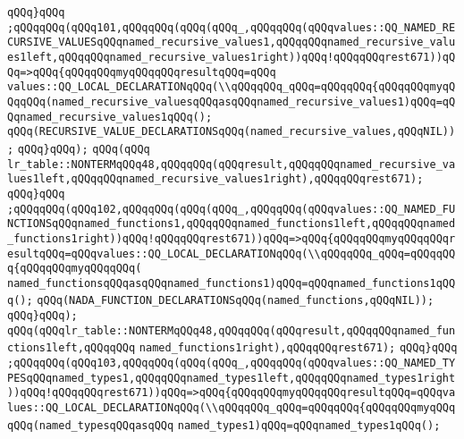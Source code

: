 \verb|qQQq}qQQq|\newline
\verb|;qQQqqQQq(qQQq101,qQQqqQQq(qQQq(qQQq_,qQQqqQQq(qQQqvalues::QQ_NAMED_RECURSIVE_VALUESqQQqnamed_recursive_values1,qQQqqQQqnamed_recursive_values1left,qQQqqQQqnamed_recursive_values1right))qQQq!qQQqqQQqrest671))qQQq=>qQQq{qQQqqQQqmyqQQqqQQqresultqQQq=qQQq|\newline
\verb|values::QQ_LOCAL_DECLARATIONqQQq(\\qQQqqQQq_qQQq=qQQqqQQq{qQQqqQQqmyqQQqqQQq(named_recursive_valuesqQQqasqQQqnamed_recursive_values1)qQQq=qQQqnamed_recursive_values1qQQq();|\newline
\verb|qQQq(RECURSIVE_VALUE_DECLARATIONSqQQq(named_recursive_values,qQQqNIL));|\newline
\verb|qQQq}qQQq);|\newline
\verb|qQQq(qQQq|\newline
\verb|lr_table::NONTERMqQQq48,qQQqqQQq(qQQqresult,qQQqqQQqnamed_recursive_values1left,qQQqqQQqnamed_recursive_values1right),qQQqqQQqrest671);|\newline
\verb|qQQq}qQQq|\newline
\verb|;qQQqqQQq(qQQq102,qQQqqQQq(qQQq(qQQq_,qQQqqQQq(qQQqvalues::QQ_NAMED_FUNCTIONSqQQqnamed_functions1,qQQqqQQqnamed_functions1left,qQQqqQQqnamed_functions1right))qQQq!qQQqqQQqrest671))qQQq=>qQQq{qQQqqQQqmyqQQqqQQqresultqQQq=qQQqvalues::QQ_LOCAL_DECLARATIONqQQq(\\qQQqqQQq_qQQq=qQQqqQQq{qQQqqQQqmyqQQqqQQq(|\newline
\verb|named_functionsqQQqasqQQqnamed_functions1)qQQq=qQQqnamed_functions1qQQq();|\newline
\verb|qQQq(NADA_FUNCTION_DECLARATIONSqQQq(named_functions,qQQqNIL));|\newline
\verb|qQQq}qQQq);|\newline
\verb|qQQq(qQQqlr_table::NONTERMqQQq48,qQQqqQQq(qQQqresult,qQQqqQQqnamed_functions1left,qQQqqQQq|\newline
\verb|named_functions1right),qQQqqQQqrest671);|\newline
\verb|qQQq}qQQq|\newline
\verb|;qQQqqQQq(qQQq103,qQQqqQQq(qQQq(qQQq_,qQQqqQQq(qQQqvalues::QQ_NAMED_TYPESqQQqnamed_types1,qQQqqQQqnamed_types1left,qQQqqQQqnamed_types1right))qQQq!qQQqqQQqrest671))qQQq=>qQQq{qQQqqQQqmyqQQqqQQqresultqQQq=qQQqvalues::QQ_LOCAL_DECLARATIONqQQq(\\qQQqqQQq_qQQq=qQQqqQQq{qQQqqQQqmyqQQqqQQq(named_typesqQQqasqQQq|\newline
\verb|named_types1)qQQq=qQQqnamed_types1qQQq();|\newline
